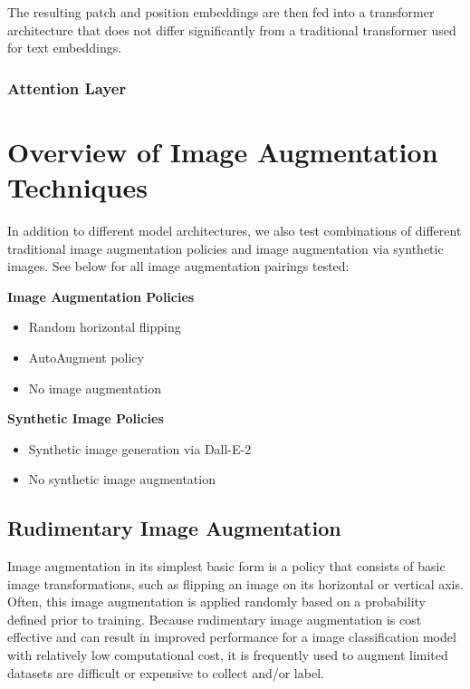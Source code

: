 \documentclass [MS] {uclathes}
\begin{document}
The resulting patch and position embeddings are then fed into a transformer architecture that does not differ 
significantly from a traditional transformer used for text embeddings.

\subsection{Attention Layer}

\chapter{Overview of Image Augmentation Techniques}
In addition to different model architectures, we also test combinations of different traditional image augmentation 
policies and image augmentation via synthetic images. See below for all image augmentation pairings tested:

\begin{multicols}{2}
    \raggedcolumns
    \textbf{Image Augmentation Policies}
    \begin{itemize}
        \item Random horizontal flipping
        \item AutoAugment policy
        \item No image augmentation
    \end{itemize}
    
    \columnbreak
    
    \textbf{Synthetic Image Policies}
    \begin{itemize}
        \item Synthetic image generation via Dall-E-2
        \item No synthetic image augmentation
    \end{itemize}
\end{multicols}

\section{Rudimentary Image Augmentation}
Image augmentation in its simplest basic form is a policy that consists of basic image transformations, such as flipping
an image on its horizontal or vertical axis. Often, this image augmentation is applied randomly based on a probability 
defined prior to training. Because rudimentary image augmentation is cost effective and can result in improved 
performance for a image classification model with relatively low computational cost, it is frequently used to augment 
limited datasets are difficult or expensive to collect and/or label.
\end{document}
